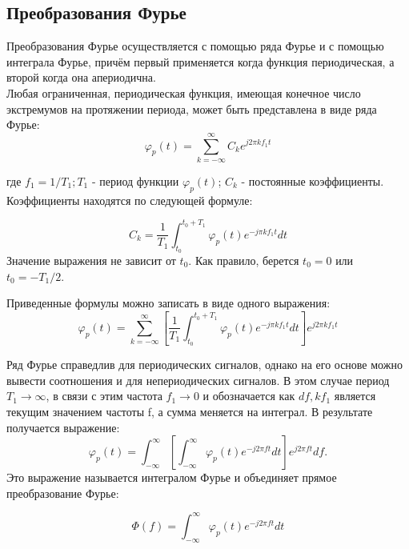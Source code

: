 \documentclass[a4paper,14pt]{extarticle}
\begin{document}
\subsection{Преобразования Фурье}

Преобразования Фурье осуществляется с помощью ряда Фурье и с 
помощью интеграла Фурье, причём первый применяется когда функция 
периодическая, а второй когда она апериодична.\\

Любая ограниченная, периодическая функция, имеющая конечное число экстремумов на протяжении периода, может быть представлена в виде ряда Фурье:
\begin{equation}
\varphi_{p}(t) = \sum\limits_{k=-\infty}^\infty C_{k}e^{j2 \pi kf_{1}t}
\end{equation}

где $f_{1} = 1/T_{1}; T_{1}$ - период функции $\varphi_{p}(t)$; $C_{k}$ - постоянные коэффициенты.\\
Коэффициенты находятся по следующей формуле:

\begin{equation}
C_{k} = \dfrac{1}{T_{1}} \int_{t_{0}}^{t_{0}+T_{1}} \varphi_{p}(t)e^{-j \pi kf_{1}t} dt
\end{equation}
Значение выражения не зависит от $t_{0}$. Как правило, берется $t_{0}=0$ или $t_{0}= -T_{1}/2$.

Приведенные формулы можно записать в виде одного выражения:
\begin{equation}
\varphi_{p}(t) = \sum\limits_{k=-\infty}^\infty \left[\frac{1}{T_{1}} \int_{t_{0}}^{t_{0}+T_{1}} \varphi_{p}(t)e^{-j \pi kf_{1}t} dt\right] e^{j2 \pi kf_{1}t}
\end{equation}

Ряд Фурье справедлив для периодических сигналов, однако на его основе можно вывести соотношения и для непериодических сигналов. В этом случае период $T_{1}\rightarrow \infty$, в связи с этим частота $f_{1}\rightarrow0$ и обозначается как $df, kf_{1}$ является текущим значением частоты f, а сумма меняется на интеграл. В результате получается выражение:
\begin{equation}
\varphi_{p}(t)= \int_{-\infty}^{\infty} \left[ \int_{-\infty}^{\infty} \varphi_{p}(t)e^{-j2 \pi ft} dt\right] e^{j2 \pi ft} df.
\end{equation}
Это выражение называется интегралом Фурье и объединяет прямое преобразование Фурье:

\begin{equation}
\Phi(f) = \int_{-\infty}^{\infty} \varphi_{p}(t)e^{-j2 \pi ft} dt
\end{equation}
\end{document}
